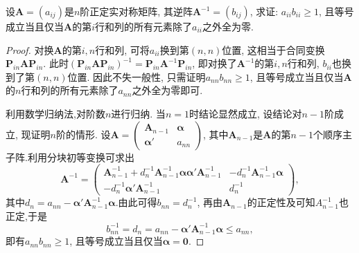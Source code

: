 \documentclass[../../main.tex]{subfiles}
\begin{document}
\begin{example}
设$\boldsymbol{A}=(a_{ij})$是$n$阶正定实对称矩阵, 其逆阵$\boldsymbol{A}^{-1}=(b_{ij})$, 求证: $a_{ii}b_{ii}\geqslant  1$, 且等号成立当且仅当$\boldsymbol{A}$的第$i$行和列的所有元素除了$a_{ii}$之外全为零.
\end{example}
\begin{proof}
对换$\boldsymbol{A}$的第$i,n$行和列, 可将$a_{ii}$换到第$(n,n)$位置, 这相当于合同变换$\boldsymbol{P}_{in}\boldsymbol{A}\boldsymbol{P}_{in}$. 此时$(\boldsymbol{P}_{in}\boldsymbol{A}\boldsymbol{P}_{in})^{-1}=\boldsymbol{P}_{in}\boldsymbol{A}^{-1}\boldsymbol{P}_{in}$, 即对换了$\boldsymbol{A}^{-1}$的第$i,n$行和列, $b_{ii}$也换到了第$(n,n)$位置. 因此不失一般性, 只需证明$a_{nn}b_{nn}\geqslant  1$, 且等号成立当且仅当$\boldsymbol{A}$的$n$行和列的所有元素除了$a_{nn}$之外全为零即可. 

利用数学归纳法,对阶数$n$进行归纳. 当$n = 1$时结论显然成立, 设结论对$n - 1$阶成立, 现证明$n$阶的情形. 设$\boldsymbol{A}=\begin{pmatrix}
\boldsymbol{A}_{n - 1} & \boldsymbol{\alpha} \\
\boldsymbol{\alpha}' & a_{nn}
\end{pmatrix}$, 其中$\boldsymbol{A}_{n - 1}$是$\boldsymbol{A}$的第$n - 1$个顺序主子阵.利用分块初等变换可求出
\[
\boldsymbol{A}^{-1}=\begin{pmatrix}
\boldsymbol{A}_{n - 1}^{-1}+d_n^{-1}\boldsymbol{A}_{n - 1}^{-1}\boldsymbol{\alpha}\boldsymbol{\alpha}'\boldsymbol{A}_{n - 1}^{-1} & -d_n^{-1}\boldsymbol{A}_{n - 1}^{-1}\boldsymbol{\alpha} \\
-d_n^{-1}\boldsymbol{\alpha}'\boldsymbol{A}_{n - 1}^{-1} & d_n^{-1}
\end{pmatrix},
\]
其中$d_n = a_{nn}-\boldsymbol{\alpha}'\boldsymbol{A}_{n - 1}^{-1}\boldsymbol{\alpha}$.由此可得$b_{nn}=d_n^{-1}$, 再由$\boldsymbol{A}_{n - 1}$的正定性及可知$A_{n-1}^{-1}$也正定,于是
\[
b_{nn}^{-1}=d_n=a_{nn}-\boldsymbol{\alpha}'\boldsymbol{A}_{n - 1}^{-1}\boldsymbol{\alpha}\leqslant  a_{nn},
\]
即有$a_{nn}b_{nn}\geqslant  1$, 且等号成立当且仅当$\boldsymbol{\alpha}=\boldsymbol{0}$. 

\end{proof}
\end{document}
